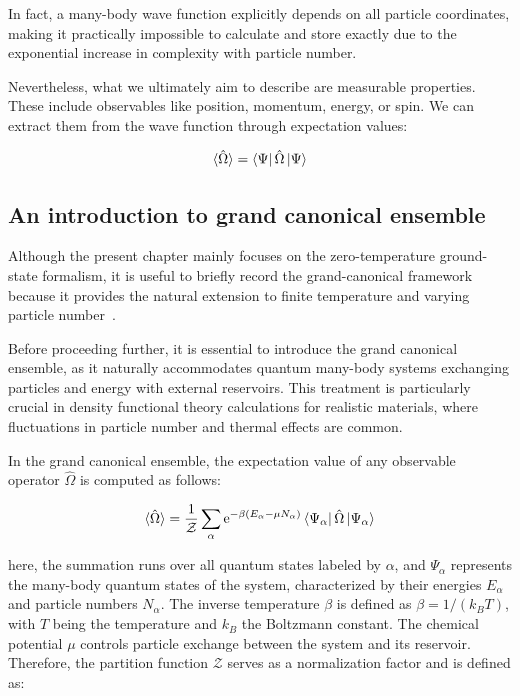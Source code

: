 In fact, a many-body wave function explicitly depends on all particle coordinates, making it practically impossible to calculate and store exactly due to the exponential increase in complexity with particle number.

Nevertheless, what we ultimately aim to describe are measurable properties.
These include observables like position, momentum, energy, or spin.
We can extract them from the wave function through expectation values:

\begin{equation}
    \braket{\hat{\Omega}} = \bra{\Psi}\hat{\Omega}\ket{\Psi}
\label{obvious}
\end{equation}

\subsection{An introduction to grand canonical ensemble}

Although the present chapter mainly focuses on the zero-temperature ground-state formalism,
it is useful to briefly record the grand-canonical framework because it provides the natural extension to finite temperature and varying particle number~\cite{gould2026ensemblization}.

Before proceeding further, it is essential to introduce the grand canonical ensemble, as it naturally accommodates quantum many-body systems exchanging particles and energy with external reservoirs.
This treatment is particularly crucial in density functional theory calculations for realistic materials, where fluctuations in particle number and thermal effects are common.

In the grand canonical ensemble, the expectation value of any observable operator $\hat{\Omega}$ is computed as follows:

\begin{equation}
    \braket{\hat{\Omega}} 
    = \frac{1}{\mathcal{Z}}\sum_{\alpha}\mathrm{e}^{-\beta(E_{\alpha}-\mu N_{\alpha})}\bra{\Psi_{\alpha}}\hat{\Omega}\ket{\Psi_{\alpha}}
\label{grand_canonical}
\end{equation}

here, the summation runs over all quantum states labeled by $\alpha$,
and $\Psi_{\alpha}$ represents the many-body quantum states of the system, characterized by their energies $E_{\alpha}$ and particle numbers $N_{\alpha}$.
The inverse temperature $\beta$ is defined as $\beta = 1/(k_B T)$, with $T$ being the temperature and $k_B$ the Boltzmann constant.
The chemical potential $\mu$ controls particle exchange between the system and its reservoir.
Therefore, the partition function $\mathcal{Z}$ serves as a normalization factor and is defined as:


